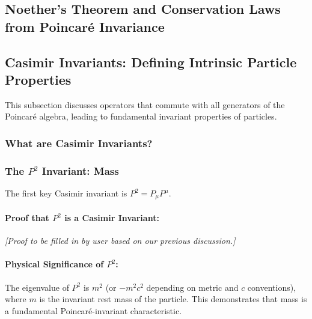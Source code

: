 \documentclass{amsart}
\theoremstyle{definition}
\theoremstyle{remark}
\begin{document}
\subsection{Noether's Theorem and Conservation Laws from Poincaré Invariance}
\label{subsec:noether_poincare}

\subsection{Casimir Invariants: Defining Intrinsic Particle Properties}
\label{subsec:casimir_invariants}
This subsection discusses operators that commute with all generators of the Poincaré algebra, leading to fundamental invariant properties of particles.

\subsubsection{What are Casimir Invariants?}
\label{subsubsec:what_are_casimirs}

\subsubsection{The $P^2$ Invariant: Mass}
\label{subsubsec:p_squared_invariant}
The first key Casimir invariant is $P^2 = P_\mu P^\mu$.

\paragraph{Proof that $P^2$ is a Casimir Invariant:}
\textit{[Proof to be filled in by user based on our previous discussion.]}

\paragraph{Physical Significance of $P^2$:}
The eigenvalue of $P^2$ is $m^2$ (or $-m^2 c^2$ depending on metric and $c$ conventions), where $m$ is the invariant rest mass of the particle. This demonstrates that mass is a fundamental Poincaré-invariant characteristic.
\end{document}
